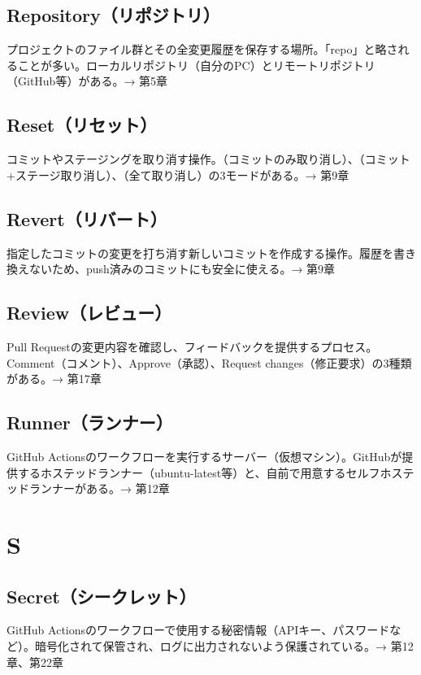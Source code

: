 \subsection*{Repository（リポジトリ）}
プロジェクトのファイル群とその全変更履歴を保存する場所。「repo」と略されることが多い。ローカルリポジトリ（自分のPC）とリモートリポジトリ（GitHub等）がある。→ 第5章

\subsection*{Reset（リセット）}
コミットやステージングを取り消す操作。（コミットのみ取り消し）、（コミット+ステージ取り消し）、（全て取り消し）の3モードがある。→ 第9章

\subsection*{Revert（リバート）}
指定したコミットの変更を打ち消す新しいコミットを作成する操作。履歴を書き換えないため、push済みのコミットにも安全に使える。→ 第9章

\subsection*{Review（レビュー）}
Pull Requestの変更内容を確認し、フィードバックを提供するプロセス。Comment（コメント）、Approve（承認）、Request changes（修正要求）の3種類がある。→ 第17章

\subsection*{Runner（ランナー）}
GitHub Actionsのワークフローを実行するサーバー（仮想マシン）。GitHubが提供するホステッドランナー（ubuntu-latest等）と、自前で用意するセルフホステッドランナーがある。→ 第12章

\section*{S}

\subsection*{Secret（シークレット）}
GitHub Actionsのワークフローで使用する秘密情報（APIキー、パスワードなど）。暗号化されて保管され、ログに出力されないよう保護されている。→ 第12章、第22章

